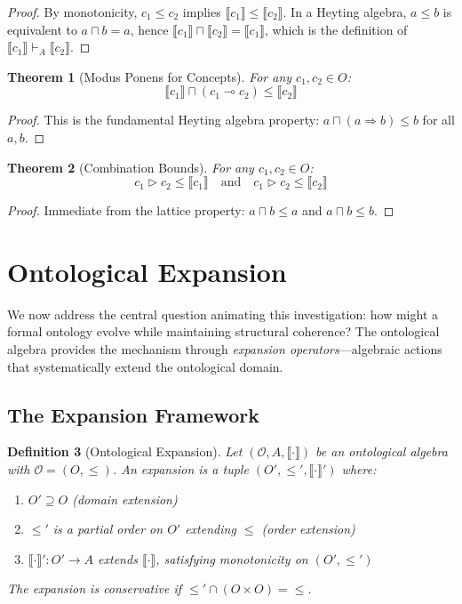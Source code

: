 \documentclass[12pt,a4paper]{article}
\newtheorem{definition}{Definition}[section]
\newtheorem{theorem}[definition]{Theorem}
\newcommand{\onto}{\mathcal{O}}
\newcommand{\sem}[1]{\llbracket #1 \rrbracket}
\begin{document}
\begin{proof}
By monotonicity, $c_1 \leq c_2$ implies $\sem{c_1} \leq \sem{c_2}$. In a Heyting algebra, $a \leq b$ is equivalent to $a \sqcap b = a$, hence $\sem{c_1} \sqcap \sem{c_2} = \sem{c_1}$, which is the definition of $\sem{c_1} \vdash_A \sem{c_2}$.
\end{proof}

\begin{theorem}[Modus Ponens for Concepts]
For any $c_1, c_2 \in O$:
$$
\sem{c_1} \sqcap (c_1 \multimap c_2) \leq \sem{c_2}
$$
\end{theorem}

\begin{proof}
This is the fundamental Heyting algebra property: $a \sqcap (a \Rightarrow b) \leq b$ for all $a, b$.
\end{proof}

\begin{theorem}[Combination Bounds]
For any $c_1, c_2 \in O$:
$$
c_1 \triangleright c_2 \leq \sem{c_1} \quad \text{and} \quad c_1 \triangleright c_2 \leq \sem{c_2}
$$
\end{theorem}

\begin{proof}
Immediate from the lattice property: $a \sqcap b \leq a$ and $a \sqcap b \leq b$.
\end{proof}

\section{Ontological Expansion}

We now address the central question animating this investigation: how might a formal ontology evolve while maintaining structural coherence? The ontological algebra provides the mechanism through \emph{expansion operators}---algebraic actions that systematically extend the ontological domain.

\subsection{The Expansion Framework}

\begin{definition}[Ontological Expansion]
Let $(\onto, A, \sem{\cdot})$ be an ontological algebra with $\onto = (O, \leq)$. An \emph{expansion} is a tuple $(O', \leq', \sem{\cdot}')$ where:
\begin{enumerate}
    \item $O' \supseteq O$ (domain extension)
    \item $\leq'$ is a partial order on $O'$ extending $\leq$ (order extension)
    \item $\sem{\cdot}' : O' \to A$ extends $\sem{\cdot}$, satisfying monotonicity on $(O', \leq')$
\end{enumerate}
The expansion is \emph{conservative} if $\leq' \cap (O \times O) = \leq$.
\end{definition}
\end{document}

